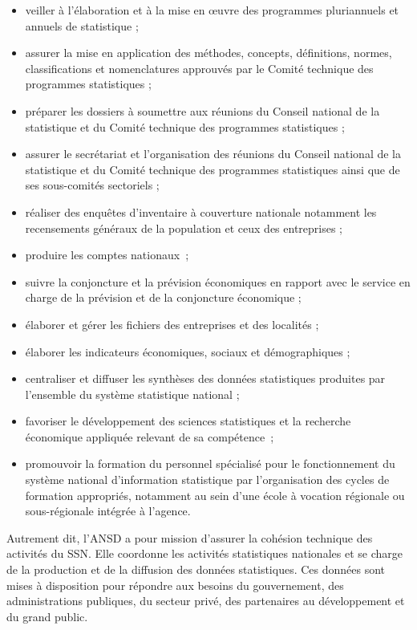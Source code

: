\begin{simplebox}
\begin{itemize}
    \item veiller à l’élaboration et à la mise en œuvre des programmes pluriannuels et annuels de statistique ;
    \item assurer la mise en application des méthodes, concepts, définitions, normes, classifications et nomenclatures approuvés par le Comité technique des programmes statistiques ;
    \item préparer les dossiers à soumettre aux réunions du Conseil national de la statistique et du Comité technique des programmes statistiques ;
    \item assurer le secrétariat et l’organisation des réunions du Conseil national de la statistique et du Comité technique des programmes statistiques ainsi que de ses sous-comités sectoriels ;
    \item réaliser des enquêtes d’inventaire à couverture nationale notamment les recensements généraux de la population et ceux des entreprises ;
    \item produire les comptes nationaux ;
    \item suivre la conjoncture et la prévision économiques en rapport avec le service en charge de la prévision et de la conjoncture économique ;
    \item élaborer et gérer les fichiers des entreprises et des localités ;
    \item élaborer les indicateurs économiques, sociaux et démographiques ;
    \item centraliser et diffuser les synthèses des données statistiques produites par l’ensemble du système statistique national ;
    \item favoriser le développement des sciences statistiques et la recherche économique appliquée relevant de sa compétence ;
    \item promouvoir la formation du personnel spécialisé pour le fonctionnement du système national d’information statistique par l’organisation des cycles de formation appropriés, notamment au sein d’une école à vocation régionale ou sous-régionale intégrée à l’agence.
\end{itemize}
\end{simplebox}

Autrement dit, l'ANSD a pour mission d'assurer la cohésion technique des activités du SSN. Elle coordonne les activités statistiques nationales et se charge de la production et de la diffusion des données statistiques. Ces données sont mises à disposition pour répondre aux besoins du gouvernement, des administrations publiques, du secteur privé, des partenaires au développement et du grand public. 

